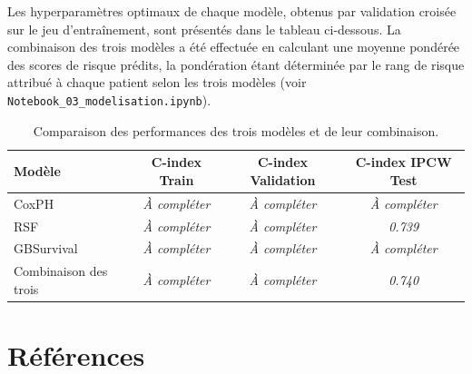 \documentclass[12pt,a4paper]{article}
\begin{document}
Les hyperparamètres optimaux de chaque modèle, obtenus par validation croisée sur le jeu d'entraînement, sont présentés dans le tableau ci-dessous. 
La combinaison des trois modèles a été effectuée en calculant une moyenne pondérée des scores de risque prédits, la pondération étant déterminée par le rang de risque attribué à chaque patient selon les trois modèles (voir \texttt{Notebook\_03\_modelisation.ipynb}).
\begin{table}[h]
\centering
\small
{}
\caption{Hyperparamètres optimaux retenus pour chaque modèle après validation croisée.}
\end{table}





\begin{table}[h]
\centering
\begin{tabular}{@{}lccc@{}}
\toprule
\textbf{Modèle} & \textbf{C-index Train} & \textbf{C-index Validation} & \textbf{C-index IPCW Test} \\
\midrule
CoxPH               & \textit{À compléter} & \textit{À compléter} & \textit{À compléter} \\
RSF                 & \textit{À compléter} & \textit{À compléter} & \textit{0.739}      \\
GBSurvival          & \textit{À compléter} & \textit{À compléter} & \textit{À compléter} \\
Combinaison des trois & \textit{À compléter} & \textit{À compléter} & \textit{0.740}      \\
\bottomrule
\end{tabular}
\caption{Comparaison des performances des trois modèles et de leur combinaison.}
\end{table}

\newpage

\section*{Références}
\end{document}

